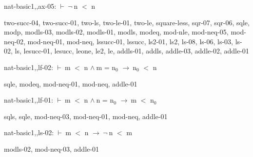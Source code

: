 \documentclass[a4paper]{article}
\newcommand{\Fol}{\mbox{$\vdash\ $}}
\newcommand{\Not}{\mbox{$\neg\ $}}
\newcommand{\And}{\mbox{$\wedge\ $}}
\newcommand{\Imp}{\mbox{$\rightarrow\ $}}
\begin{document}
\bigskip

nat-basic1,,ax-05: 
 \Fol \Not n $<$ n



two-succ-04, two-succ-01, two-ls, two-le-01, two-le, square-less, sqr-07, sqr-06, sqle, modp, modls-03, modls-02, modls-01, modls, modeq, mod-nle, mod-neq-05, mod-neq-02, mod-neq-01, mod-neq, lssucc-01, lssucc, ls2-01, ls2, ls-08, ls-06, ls-03, ls-02, ls, lesucc-01, lesucc, leone, le2, le, addls-01, addls, addle-03, addle-02, addle-01

\bigskip

nat-basic1,,lf-02: 
 \Fol m $<$ n \And m = $\mbox{n}_{0}$ \Imp $\mbox{n}_{0}$ $<$ n



sqle, modeq, mod-neq-01, mod-neq, addle-01

\bigskip

nat-basic1,,lf-01: 
 \Fol m $<$ n \And n = $\mbox{n}_{0}$ \Imp m $<$ $\mbox{n}_{0}$



sqls, sqle, mod-neq-03, mod-neq-01, mod-neq, addle-01

\bigskip

nat-basic1,,ls-02: 
 \Fol m $<$ n \Imp \Not n $<$ m



modls-02, mod-neq-03, addle-01

\bigskip
\end{document}

